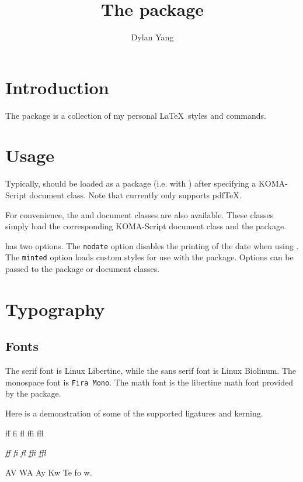 \documentclass{l3doc}
\title{The \pkg{gravy} package}
\author{Dylan Yang}
\begin{document}
\maketitle

\tableofcontents

\clearpage

\section{Introduction}

The  package is a collection of my personal \LaTeX\ styles and commands.

\section{Usage}

Typically,  should be loaded as a package (i.e. with ) after specifying a KOMA-Script document class. Note that  currently only supports pdf\TeX.

For convenience, the  and  document classes are also available. These classes simply load the corresponding KOMA-Script document class and the  package.

 has two options. The \texttt{nodate} option disables the printing of the date when using . The \texttt{minted} option loads custom styles for use with the  package. Options can be passed to the  package or document classes.

\section{Typography}

\subsection{Fonts}

The serif font is Linux Libertine, while the sans serif font is \textsf{Linux Biolinum}. The monospace font is \texttt{Fira Mono}. The math font is the libertine math font provided by the  package.

Here is a demonstration of some of the supported ligatures and kerning.

\begin{center}
  \huge{ff fi fl ffi ffl}

  \vspace{0.5em}

  \huge{\textit{ff fi fl ffi ffl}}

  \vspace{0.5em}

  \huge{AV WA Ay Kw Te fo w.}
\end{center}
\end{document}
